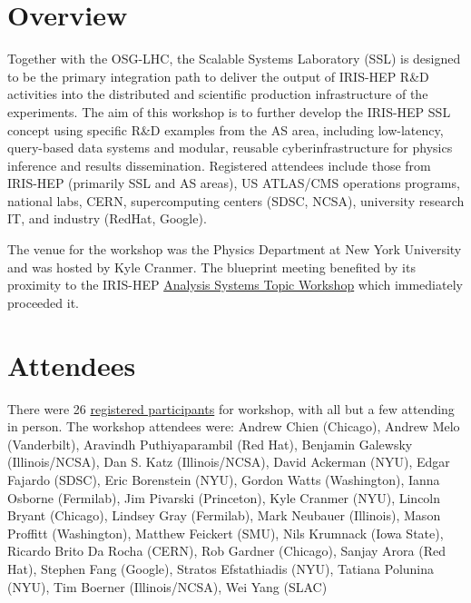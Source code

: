 \documentclass[11pt,letterpaper,fleqn]{article}
\begin{document}

\newpage
\thispagestyle{reststyle}

\section{Overview}
Together with the OSG-LHC, the Scalable Systems Laboratory (SSL) is designed to be the primary integration path to deliver the output of IRIS-HEP R\&D activities into the distributed and scientific production infrastructure of the experiments. The aim of this workshop is to further develop the IRIS-HEP SSL concept using specific R\&D examples from the AS area, including  low-latency, query-based data systems and modular, reusable cyberinfrastructure for physics inference and results dissemination. Registered attendees include those from IRIS-HEP (primarily SSL and AS areas), US ATLAS/CMS operations programs, national labs, CERN, supercomputing centers (SDSC, NCSA), university research IT, and industry (RedHat, Google).

The venue for the workshop was the Physics Department at New York University and was hosted by Kyle Cranmer.  The blueprint meeting benefited by its proximity to the IRIS-HEP \href{https://indico.cern.ch/event/822074/}{Analysis Systems Topic Workshop} which immediately proceeded it.

\section{Attendees}
There were 26 \href{https://indico.cern.ch/event/820946/registrations/participants}{registered participants} for workshop, with all but a few attending in person. The workshop attendees were:
Andrew Chien (Chicago),
Andrew Melo (Vanderbilt),
Aravindh Puthiyaparambil (Red Hat),
Benjamin Galewsky (Illinois/NCSA),
Dan S. Katz (Illinois/NCSA),
David Ackerman (NYU),
Edgar Fajardo (SDSC),
Eric Borenstein (NYU),
Gordon Watts (Washington),
Ianna Osborne (Fermilab),
Jim Pivarski (Princeton),
Kyle Cranmer (NYU),
Lincoln Bryant (Chicago),
Lindsey Gray (Fermilab),
Mark Neubauer (Illinois),
Mason Proffitt (Washington),
Matthew Feickert (SMU),
Nils Krumnack (Iowa State),
Ricardo Brito Da Rocha (CERN),
Rob Gardner (Chicago),
Sanjay Arora (Red Hat),
Stephen Fang (Google),
Stratos Efstathiadis (NYU),
Tatiana Polunina (NYU),
Tim Boerner (Illinois/NCSA),
Wei Yang (SLAC)
\end{document}
